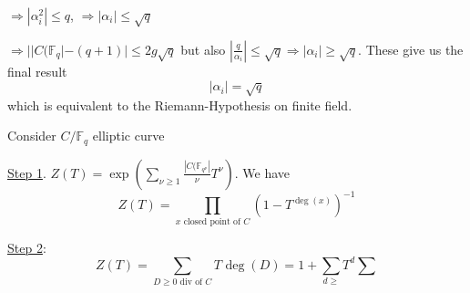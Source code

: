\documentclass[11pt]{article}
\newcommand{\bbf}{\mathbb F}
\newcommand{\Lrta}{\Longrightarrow}
\begin{document}
$\Lrta |\alpha_i^2|\leq q$, $\Lrta |\alpha_i|\leq \sqrt{q}$

$\Lrta ||C(\bbf_q|-(q+1)|\leq 2g\sqrt{q}$ but also 
$\left|\frac{q}{\alpha_i}\right|\leq \sqrt{q}\Lrta |\alpha_i|\geq \sqrt{q}$. These give us the final result
$$
|\alpha_i|=\sqrt{q}
$$
which is equivalent to the Riemann-Hypothesis on finite field.


Consider $C/\bbf_q$ elliptic curve

\underline{Step 1}. $Z(T)=\exp\left(\sum_{\nu\geq 1}\frac{|C(\bbf_{q^\nu}|}{\nu} T^\nu\right)$. We have
 $$
 Z(T)=\prod_{x\text{ closed point of }C}(1- T^{\deg(x)})^{-1}
 $$

 \underline{Step 2}:
 $$
 Z(T)=\sum_{D\geq 0\text{ div of } C} T^{}\deg(D)=1+\sum_{d\geq }T^d \sum
 $$
\end{document}
